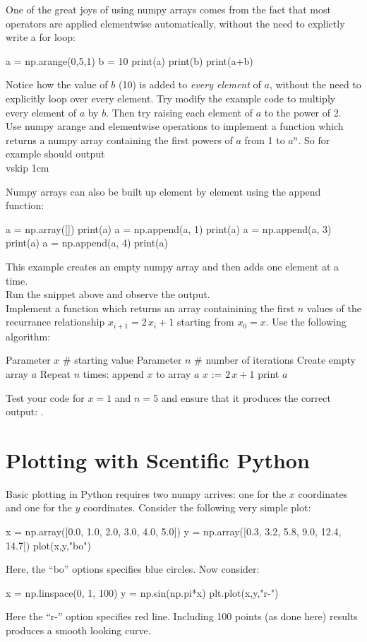 One of the great joys of using numpy arrays comes from the fact that
most operators are applied elementwise automatically, without the need
to explictly write a for loop:
\begin{python}
a = np.arange(0,5,1)
b = 10
print(a)
print(b)
print(a+b)
\end{python}
Notice how the value of $b$ (10) is added to {\em every element} of
$a$, without the need to explicitly loop over every element.  Try
modify the example code to multiply every element of $a$ by $b$. Then
try raising each element of $a$ to the power of 2. \\

\plot Use numpy arange and elementwise operations to implement a
function  which returns a numpy array
containing the first powers of $a$ from 1 to $a^n$.  So for example
 should output \pyth{[ 1 2 4 8 16]} \\ vskip
1cm

Numpy arrays can also be built up element by element using the append
function:
\begin{python}
a = np.array([])
print(a)
a = np.append(a, 1)
print(a)
a = np.append(a, 3)
print(a)
a = np.append(a, 4)
print(a)
\end{python}
This example creates an empty numpy array and then adds one element at a time.\\

\plot Run the snippet above and observe the output.\\

\plot Implement a function  which returns an
array containining the first $n$ values of the recurrance relationship
$x_{i+1}=2 \, x_{i}+1$ starting from $x_0=x$.  Use the following algorithm:
\begin{algorithm}
  Parameter $x$ # starting value
  Parameter $n$ # number of iterations
  Create empty array $a$ 
  Repeat $n$ times:
     append $x$ to array $a$
     $x$ := $2\,x + 1$
  print $a$
\end{algorithm}
Test your code for $x=1$ and $n=5$ and ensure that it produces the
correct output: \pyth{[ 1.  3.  7. 15. 31.]}.\\

\section{Plotting with Scentific Python}

Basic plotting in Python requires two numpy arrives: one for the $x$
coordinates and one for the $y$ coordinates.  Consider the following
very simple plot:
\begin{python}
x = np.array([0.0, 1.0, 2.0, 3.0, 4.0,  5.0])
y = np.array([0.3, 3.2, 5.8, 9.0, 12.4, 14.7])
plot(x,y,"bo")
\end{python}
Here, the ``bo'' options specifies blue circles.  Now consider:
\begin{python}
x = np.linspace(0, 1, 100)
y = np.sin(np.pi*x)
plt.plot(x,y,"r-")
\end{python}
Here the ``r-'' option specifies red line.  Including 100 points (as
done here) results produces a smooth looking curve.

